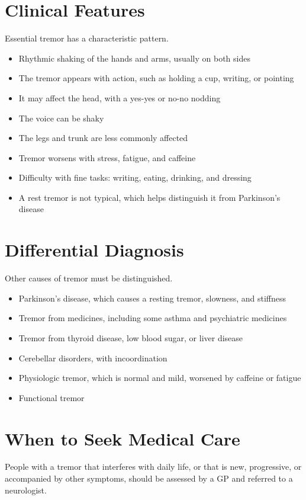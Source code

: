 \section*{Clinical Features}
Essential tremor has a characteristic pattern.
\begin{itemize}
    \item Rhythmic shaking of the hands and arms, usually on both sides
    \item The tremor appears with action, such as holding a cup, writing, or pointing
    \item It may affect the head, with a yes-yes or no-no nodding
    \item The voice can be shaky
    \item The legs and trunk are less commonly affected
    \item Tremor worsens with stress, fatigue, and caffeine
    \item Difficulty with fine tasks: writing, eating, drinking, and dressing
    \item A rest tremor is not typical, which helps distinguish it from Parkinson's disease
\end{itemize}

\section*{Differential Diagnosis}
Other causes of tremor must be distinguished.
\begin{itemize}
    \item Parkinson's disease, which causes a resting tremor, slowness, and stiffness
    \item Tremor from medicines, including some asthma and psychiatric medicines
    \item Tremor from thyroid disease, low blood sugar, or liver disease
    \item Cerebellar disorders, with incoordination
    \item Physiologic tremor, which is normal and mild, worsened by caffeine or fatigue
    \item Functional tremor
\end{itemize}

\section*{When to Seek Medical Care}
People with a tremor that interferes with daily life, or that is new, progressive, or accompanied by other symptoms, should be assessed by a GP and referred to a neurologist.

